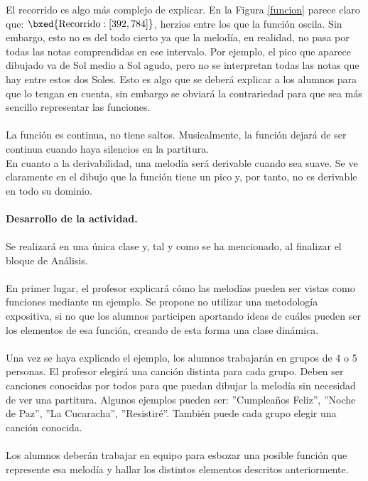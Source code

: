 \documentclass[a4paper, openright, 11pt, titlepage]{report}
\theoremstyle{definition}\newtheorem{defin}[propo]{Definition}
\theoremstyle{definition}\newtheorem{obser}[propo]{Remark}
\theoremstyle{definition}\newtheorem{ejem}[propo]{Ejemplo}
\theoremstyle{definition}\newtheorem{algoritmo}[propo]{Algoritmo}
\begin{document}
El recorrido es algo más complejo de explicar. En la Figura \ref{funcion} parece claro que: $\bxed{\text{Recorrido}: [392, 784]}$, herzios entre los que la función oscila. Sin embargo, esto no es del todo cierto ya que la melodía, en realidad, no pasa por todas las notas comprendidas en ese intervalo. Por ejemplo, el pico que aparece dibujado va de Sol medio a Sol agudo, pero no se interpretan todas las notas que hay entre estos dos Soles. Esto es algo que se deberá explicar a los alumnos para que lo tengan en cuenta, sin embargo se obviará la contrariedad para que sea más sencillo representar las funciones.\\\\
La función es continua, no tiene saltos. Musicalmente, la función dejará de ser continua cuando haya silencios en la partitura.\\
En cuanto a la derivabilidad, una melodía será derivable cuando sea suave. Se ve claramente en el dibujo que la función tiene un pico y, por tanto, no es derivable en todo su dominio.\\\\
\textbf{Desarrollo de la actividad.}\\\\
Se realizará en una única clase y, tal y como se ha mencionado, al finalizar el bloque de Análisis.\\\\
En primer lugar, el profesor explicará cómo las melodías pueden ser vistas como funciones mediante un ejemplo. Se propone no utilizar una metodología expositiva, si no que los alumnos participen aportando ideas de cuáles pueden ser los elementos de esa función, creando de esta forma una clase dinámica.\\\\
Una vez se haya explicado el ejemplo, los alumnos trabajarán en grupos de 4 o 5 personas. El profesor elegirá una canción distinta para cada grupo. Deben ser canciones conocidas por todos para que puedan dibujar la melodía sin necesidad de ver una partitura. Algunos ejemplos pueden ser: ''Cumpleaños Feliz'', ''Noche de Paz'', ''La Cucaracha'', ''Resistiré''. También puede cada grupo elegir una canción conocida.\\\\
Los alumnos deberán trabajar en equipo para esbozar una posible función que represente esa melodía y hallar los distintos elementos descritos anteriormente. 
\end{document}
